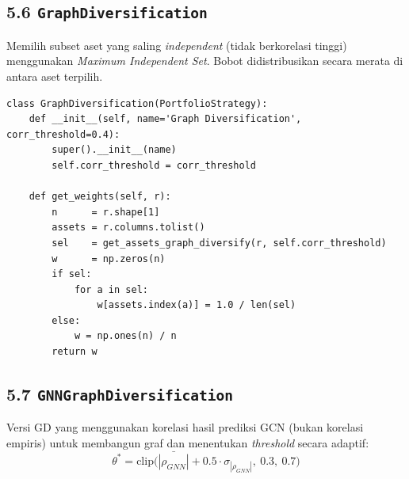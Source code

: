 \documentclass[12pt,a4paper]{article}
\begin{document}
\subsection{5.6 \texttt{GraphDiversification}}
Memilih subset aset yang saling \textit{independent} (tidak berkorelasi tinggi)
menggunakan \textit{Maximum Independent Set}. Bobot didistribusikan secara merata
di antara aset terpilih.

\begin{lstlisting}[caption={GraphDiversification}]
class GraphDiversification(PortfolioStrategy):
    def __init__(self, name='Graph Diversification', corr_threshold=0.4):
        super().__init__(name)
        self.corr_threshold = corr_threshold

    def get_weights(self, r):
        n      = r.shape[1]
        assets = r.columns.tolist()
        sel    = get_assets_graph_diversify(r, self.corr_threshold)
        w      = np.zeros(n)
        if sel:
            for a in sel:
                w[assets.index(a)] = 1.0 / len(sel)
        else:
            w = np.ones(n) / n
        return w
\end{lstlisting}

\subsection{5.7 \texttt{GNNGraphDiversification}}
Versi GD yang menggunakan korelasi hasil prediksi GCN (bukan korelasi empiris)
untuk membangun graf dan menentukan \textit{threshold} secara adaptif:
\[
\theta^* = \text{clip}\bigl(\bar{|\rho_{GNN}|} + 0.5 \cdot \sigma_{|\rho_{GNN}|},\ 0.3,\ 0.7\bigr)
\]
\end{document}
